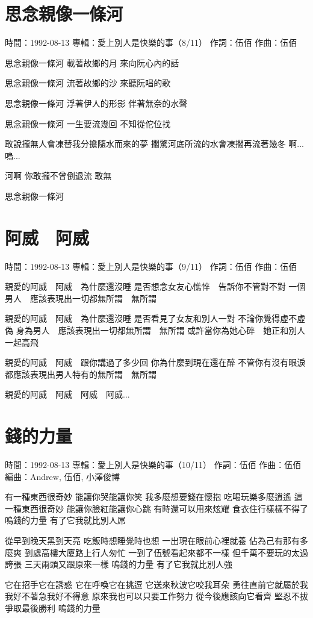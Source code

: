 \documentclass[UTF8,a4paper,oneside,twocolumn,12pt]{ctexbook}
\newcommand{\infopair}[2]{\textbullet #1：#2}
\newcommand{\zc}[1][伍佰]{\infopair{作詞}{#1}}
\newcommand{\zq}[1][伍佰]{\infopair{作曲}{#1}}
\newcommand{\bq}[1][伍佰]{\infopair{編曲}{#1}}
\newcommand{\zj}[1]{\infopair{專輯}{#1}}
\newcommand{\sj}[1]{\infopair{時間}{#1}}
\newenvironment{info}{\begin{flushleft}\kaishu
	}
	{\end{flushleft}\normalsize\yahei\par}
\newenvironment{lyric}{
	}
{}
\begin{document}
\section{思念親像一條河}
\begin{info}
	\sj{1992-08-13}
	\zj{愛上別人是快樂的事（8/11）}
	\zc
	\zq
\end{info}
\begin{lyric}
	思念親像一條河
	載著故鄉的月
	來向阮心內的話

	思念親像一條河
	流著故鄉的沙
	來聽阮唱的歌

	思念親像一條河
	浮著伊人的形影
	伴著無奈的水聲

	思念親像一條河
	一生要流幾回
	不知從佗位找

	敢說攏無人會凍替我分擔隨水而來的夢
	擱驚河底所流的水會凍擱再流著幾冬
	啊...嗚...

	河啊
	你敢攏不曾倒退流
	敢無

	思念親像一條河
\end{lyric}

\section{阿威　阿威}
\begin{info}
	\sj{1992-08-13}
	\zj{愛上別人是快樂的事（9/11）}
	\zc
	\zq
\end{info}
\begin{lyric}
	親愛的阿威　阿威　為什麼還沒睡
	是否想念女友心憔悴　告訴你不管對不對
	一個男人　應該表現出一切都無所謂　無所謂

	親愛的阿威　阿威　為什麼還沒睡
	是否看見了女友和別人一對
	不論你覺得虛不虛偽
	身為男人　應該表現出一切都無所謂　無所謂
	或許當你為她心碎　她正和別人一起高飛

	親愛的阿威　阿威　跟你講過了多少回
	你為什麼到現在還在醉
	不管你有沒有眼淚
	都應該表現出男人特有的無所謂　無所謂

	親愛的阿威　阿威　阿威　阿威...
\end{lyric}

\section{錢的力量}
\begin{info}
	\sj{1992-08-13}
	\zj{愛上別人是快樂的事（10/11）}
	\zc
	\zq
	\bq[Andrew, 伍佰, 小澤俊博]
\end{info}
\begin{lyric}
	有一種東西很奇妙
	能讓你哭能讓你笑
	我多麼想要錢在懷抱
	吃喝玩樂多麼逍遙
	這一種東西很奇妙
	能讓你臉紅能讓你心跳
	有時還可以用來炫耀
	食衣住行樣樣不得了
	嗚錢的力量
	有了它我就比別人屌

	從早到晚天黑到天亮
	吃飯時想睡覺時也想
	一出現在眼前心裡就養
	佔為己有那有多麼爽
	到處高樓大廈路上行人匆忙
	一到了伍號看起來都不一樣
	但千萬不要玩的太過誇張
	三天兩頭又跟原來一樣
	嗚錢的力量
	有了它我就比別人強

	它在招手它在誘惑
	它在呼喚它在挑逗
	它送來秋波它咬我耳朵
	勇往直前它就屬於我
	我好不著急我好不得意
	原來我也可以只要工作努力
	從今後應該向它看齊
	堅忍不拔爭取最後勝利
	嗚錢的力量
\end{lyric}
\end{document}
